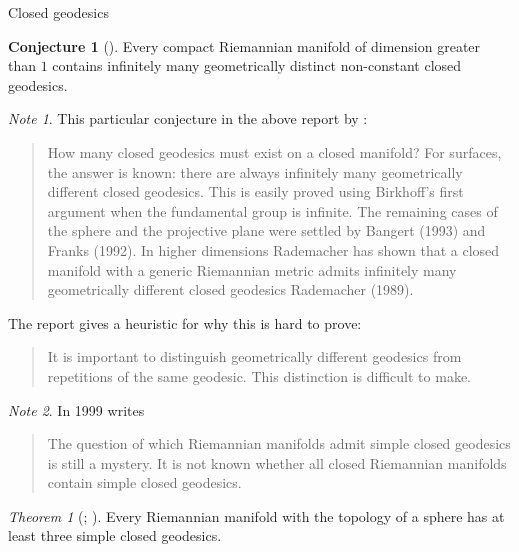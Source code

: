 \documentclass{article}
\theoremstyle{definition}
\newtheorem{conjecture}{Conjecture}[section]
\theoremstyle{remark}
\newtheorem{remark}{Note}[section]
\newtheorem{theorem}{Theorem}[section]
\begin{document}
\begin{section}{Closed geodesics}
  \begin{conjecture}[\cite{Burns}]
    Every compact Riemannian manifold of dimension greater than $1$ contains infinitely
    many geometrically distinct non-constant closed geodesics.
  \end{conjecture}
  \begin{remark}
    This particular conjecture in the above report by \cite{Burns}:
    \begin{quote}
      How many closed geodesics must exist on a closed manifold? For surfaces, the
      answer is known: there are always infinitely many geometrically different
      closed geodesics. This is easily proved using Birkhoff’s first argument when
      the fundamental group is infinite. The remaining cases of the sphere and the
      projective plane were settled by Bangert (1993) and Franks (1992). In higher
      dimensions Rademacher has shown that a closed manifold with a generic
      Riemannian metric admits infinitely many geometrically different closed
      geodesics Rademacher (1989).
    \end{quote}
    The report gives a heuristic for why this is hard to prove: \begin{quote}
      It is important to distinguish geometrically different geodesics from
      repetitions of the same geodesic. This distinction is difficult to make.
    \end{quote}
  \end{remark}

  \begin{remark}
    In 1999 \cite{adams} writes \begin{quote}
      The question of which Riemannian manifolds admit simple closed geodesics
      is still a mystery. It is not known whether all closed Riemannian
      manifolds contain simple closed geodesics.
    \end{quote}
  \end{remark}
  \begin{theorem}[\cite{Schnirelmann}; \cite{Ballmann}]
    Every Riemannian manifold with the topology of a sphere has at least three
    simple closed geodesics.
  \end{theorem}


\end{section}
\end{document}
